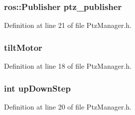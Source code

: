 \subsubsection[{ptz\-\_\-publisher}]{\setlength{\rightskip}{0pt plus 5cm}ros\-::\-Publisher {\bf ptz\-\_\-publisher}}\label{PtzManager_8h_a4f09e4bd35d186f301b0defb837d03a6}


\-Definition at line 21 of file \-Ptz\-Manager.\-h.

\subsubsection[{tilt\-Motor}]{ {\bf tilt\-Motor}}\label{PtzManager_8h_ad3262e4d179cdd765ff7fe4e04f59519}


\-Definition at line 18 of file \-Ptz\-Manager.\-h.

\subsubsection[{up\-Down\-Step}]{\setlength{\rightskip}{0pt plus 5cm}int {\bf up\-Down\-Step}}\label{PtzManager_8h_aa69ba01631e95ead9ba6aa98b08f787d}


\-Definition at line 20 of file \-Ptz\-Manager.\-h.

